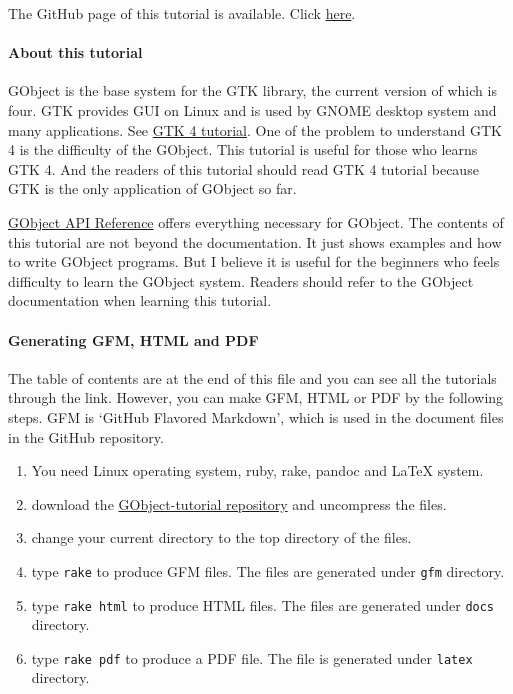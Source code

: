 The GitHub page of this tutorial is available. Click
\href{https://toshiocp.github.io/Gobject-tutorial/}{here}.

\paragraph{About this tutorial}\label{about-this-tutorial}

GObject is the base system for the GTK library, the current version of
which is four. GTK provides GUI on Linux and is used by GNOME desktop
system and many applications. See
\href{https://github.com/ToshioCP/Gtk4-tutorial}{GTK 4 tutorial}. One of
the problem to understand GTK 4 is the difficulty of the GObject. This
tutorial is useful for those who learns GTK 4. And the readers of this
tutorial should read GTK 4 tutorial because GTK is the only application
of GObject so far.

\href{https://docs.gtk.org/gobject/}{GObject API Reference} offers
everything necessary for GObject. The contents of this tutorial are not
beyond the documentation. It just shows examples and how to write
GObject programs. But I believe it is useful for the beginners who feels
difficulty to learn the GObject system. Readers should refer to the
GObject documentation when learning this tutorial.

\paragraph{Generating GFM, HTML and
PDF}\label{generating-gfm-html-and-pdf}

The table of contents are at the end of this file and you can see all
the tutorials through the link. However, you can make GFM, HTML or PDF
by the following steps. GFM is `GitHub Flavored Markdown', which is used
in the document files in the GitHub repository.

\begin{enumerate}
\def\labelenumi{\arabic{enumi}.}
\tightlist
\item
  You need Linux operating system, ruby, rake, pandoc and LaTeX system.
\item
  download the
  \href{https://github.com/ToshioCP/Gobject-tutorial}{GObject-tutorial
  repository} and uncompress the files.
\item
  change your current directory to the top directory of the files.
\item
  type \passthrough{\lstinline!rake!} to produce GFM files. The files
  are generated under \passthrough{\lstinline!gfm!} directory.
\item
  type \passthrough{\lstinline!rake html!} to produce HTML files. The
  files are generated under \passthrough{\lstinline!docs!} directory.
\item
  type \passthrough{\lstinline!rake pdf!} to produce a PDF file. The
  file is generated under \passthrough{\lstinline!latex!} directory.
\end{enumerate}

